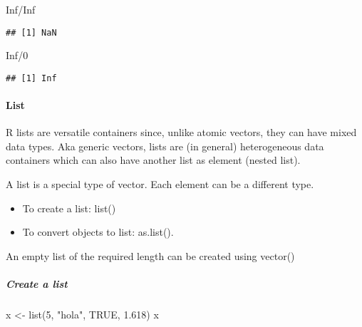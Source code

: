\documentclass[
]{article}
\newenvironment{Shaded}{\begin{snugshade}}{\end{snugshade}}
\newcommand{\ConstantTok}[1]{\textcolor[rgb]{0.00,0.00,0.00}{#1}}
\newcommand{\DecValTok}[1]{\textcolor[rgb]{0.00,0.00,0.81}{#1}}
\newcommand{\FloatTok}[1]{\textcolor[rgb]{0.00,0.00,0.81}{#1}}
\newcommand{\FunctionTok}[1]{\textcolor[rgb]{0.00,0.00,0.00}{#1}}
\newcommand{\NormalTok}[1]{#1}
\newcommand{\OtherTok}[1]{\textcolor[rgb]{0.56,0.35,0.01}{#1}}
\newcommand{\SpecialCharTok}[1]{\textcolor[rgb]{0.00,0.00,0.00}{#1}}
\newcommand{\StringTok}[1]{\textcolor[rgb]{0.31,0.60,0.02}{#1}}
\providecommand{\tightlist}{%
  \setlength{\itemsep}{0pt}\setlength{\parskip}{0pt}}
\begin{document}
\begin{Shaded}
\begin{Highlighting}[]
\ConstantTok{Inf}\SpecialCharTok{/}\ConstantTok{Inf}
\end{Highlighting}
\end{Shaded}

\begin{verbatim}
## [1] NaN
\end{verbatim}

\begin{Shaded}
\begin{Highlighting}[]
\ConstantTok{Inf}\SpecialCharTok{/}\DecValTok{0}
\end{Highlighting}
\end{Shaded}

\begin{verbatim}
## [1] Inf
\end{verbatim}

\hypertarget{list}{%
\paragraph{List}\label{list}}

R lists are versatile containers since, unlike atomic vectors, they can
have mixed data types. Aka generic vectors, lists are (in general)
heterogeneous data containers which can also have another list as
element (nested list).

A list is a special type of vector. Each element can be a different
type.

\begin{itemize}
\tightlist
\item
  To create a list: list()
\item
  To convert objects to list: as.list().
\end{itemize}

An empty list of the required length can be created using vector()

\hypertarget{create-a-list}{%
\subparagraph{Create a list}\label{create-a-list}}

\begin{Shaded}
\begin{Highlighting}[]
\NormalTok{x }\OtherTok{\textless{}{-}} \FunctionTok{list}\NormalTok{(}\DecValTok{5}\NormalTok{, }\StringTok{"hola"}\NormalTok{, }\ConstantTok{TRUE}\NormalTok{, }\FloatTok{1.618}\NormalTok{)}
\NormalTok{x}
\end{Highlighting}
\end{Shaded}
\end{document}
